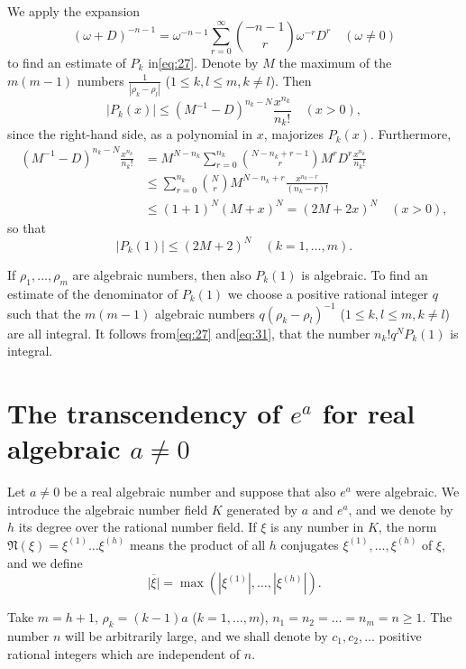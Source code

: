 We apply the expansion
\begin{equation} (\omega + D)^{-n-1} = \omega^{-n-1} \sum_{r=0}^{\infty} \binom{-n-1}{r} \omega^{-r} D^r \quad (\omega \neq 0) \tag{31}\label{eq:31} \end{equation}
to find an estimate of $P_k$ in\eqref{eq:27}. Denote by $M$ the maximum of the $m(m-1)$ numbers $\frac{1}{|\rho_k - \rho_l|}$ ($1 \leq k, l \leq m, k \neq l$). Then
\[ |P_{k}(x)| \le (M^{-1} - D)^{n_{k} - N} \frac{x^{n_{k}}}{n_{k}!} \quad (x>0), \]
since the right-hand side, as a polynomial in $x$, majorizes $P_k(x)$. Furthermore,
\[ \begin{aligned} (M^{-1} - D)^{n_k - N} \frac{x^{n_k}}{n_k!} &= M^{N - n_k} \sum_{r=0}^{n_k} \binom{N - n_k + r - 1}{r} M^r D^r \frac{x^{n_k}}{n_k!} \\ &\leq \sum_{r=0}^{n_k} \binom{N}{r} M^{N-n_k+r} \frac{x^{n_k-r}}{(n_k-r)!} \\ &\leq (1+1)^N (M+x)^N = (2M+2x)^N \quad (x>0), \end{aligned} \]
so that
\begin{equation} |P_{k}(1)| \le (2M+2)^{N} \quad (k=1,\dots,m). \tag{32}\label{eq:32} \end{equation}

If $\rho_1, \dots, \rho_m$ are algebraic numbers, then also $P_k(1)$ is algebraic. To find an estimate of the denominator of $P_k(1)$ we choose a positive rational integer $q$ such that the $m(m-1)$ algebraic numbers $q(\rho_k - \rho_l)^{-1}$ ($1 \leq k, l \leq m, k \neq l$) are all integral. It follows from\eqref{eq:27} and\eqref{eq:31}, that the number $n_k! q^N P_k(1)$ is integral.

\section{The transcendency of $e^a$ for real algebraic $a \neq 0$}

Let $a \neq 0$ be a real algebraic number and suppose that also $e^a$ were algebraic. We introduce the algebraic number field $K$ generated by $a$ and $e^a$, and we denote by $h$ its degree over the rational number field. If $\xi$ is any number in $K$, the norm $\mathfrak{N}(\xi) = \xi^{(1)} \dots \xi^{(h)}$ means the product of all $h$ conjugates $\xi^{(1)}, \dots, \xi^{(h)}$ of $\xi$, and we define
\[ \overline{|\xi|} = \max (|\xi^{(1)}|, \ldots, |\xi^{(h)}|). \]

Take $m=h+1$, $\rho_k=(k-1)a$ ($k=1,\dots,m$), $n_1=n_2=\dots=n_m=n \geq 1$. The number $n$ will be arbitrarily large, and we shall denote by $c_1, c_2, \dots$ positive rational integers which are independent of $n$.

